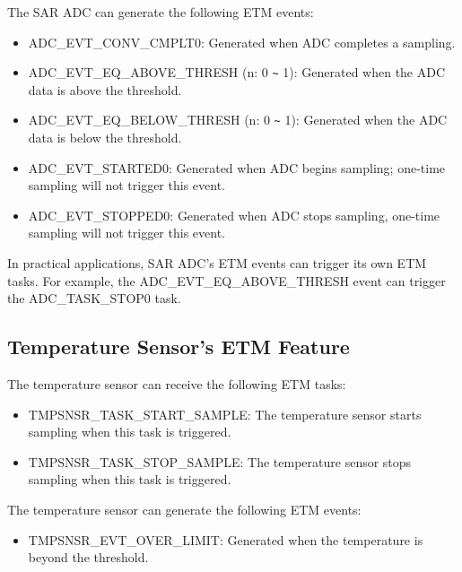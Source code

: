 \documentclass[main\_\_EN.tex]{subfiles}
\begin{document}
The SAR ADC can generate the following ETM events:

\begin{itemize}
    \item ADC\_EVT\_CONV\_CMPLT0: Generated when ADC completes a sampling.
    \item ADC\_EVT\_EQ\_ABOVE\_THRESH (n: 0 \verb+~+ 1): Generated when the ADC data is above the threshold. 
    \item ADC\_EVT\_EQ\_BELOW\_THRESH (n: 0 \verb+~+ 1): Generated when the ADC data is below the threshold.
    \item ADC\_EVT\_STARTED0: Generated when ADC begins sampling; one-time sampling will not trigger this event.
    \item ADC\_EVT\_STOPPED0: Generated when ADC stops sampling, one-time sampling will not trigger this event.
\end{itemize}

In practical applications, SAR ADC's ETM events can trigger its own ETM tasks. For example, the ADC\_EVT\_EQ\_ABOVE\_THRESH event can trigger the ADC\_TASK\_STOP0 task.

\subsection{Temperature Sensor's ETM Feature}

The temperature sensor can receive the following ETM tasks:

\begin{itemize}
    \item TMPSNSR\_TASK\_START\_SAMPLE: The temperature sensor starts sampling when this task is triggered.
    \item TMPSNSR\_TASK\_STOP\_SAMPLE: The temperature sensor stops sampling when this task is triggered.
\end{itemize}

The temperature sensor can generate the following ETM events:

\begin{itemize}
    \item TMPSNSR\_EVT\_OVER\_LIMIT: Generated when the temperature is beyond the threshold.
\end{itemize}
\end{document}
